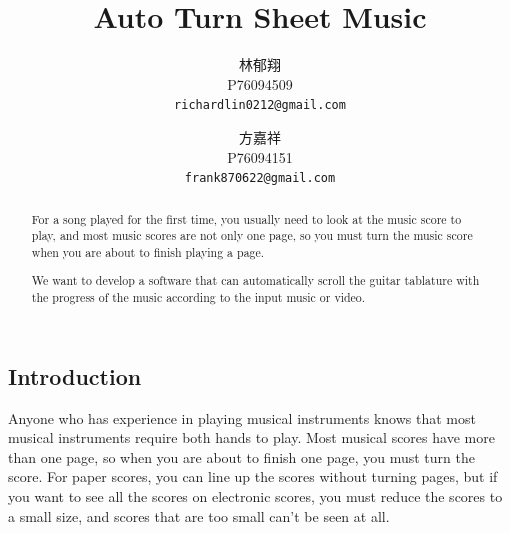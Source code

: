 \documentclass[10pt,twocolumn,letterpaper]{article}
\begin{document}
\begin{CJK}{UTF8}{bsmi}

\title{Auto Turn Sheet Music}

\author{林郁翔\\
P76094509\\
{\tt\small richardlin0212@gmail.com}
\and
方嘉祥\\
P76094151\\
{\tt\small frank870622@gmail.com}
}

\maketitle

\begin{abstract}
   For a song played for the first time, you usually need to look at the music score to play, and most music scores are not only one page, so you must turn the music score when you are about to finish playing a page.

   We want to develop a software that can automatically scroll the guitar tablature with the progress of the music according to the input music or video.
\end{abstract}

\section{Introduction}

Anyone who has experience in playing musical instruments knows that most musical instruments require both hands to play.
Most musical scores have more than one page, so when you are about to finish one page, you must turn the score.
For paper scores, you can line up the scores without turning pages, but if you want to see all the scores on electronic scores, you must reduce the scores to a small size, and scores that are too small can’t be seen at all.


\end{CJK}
\end{document}
